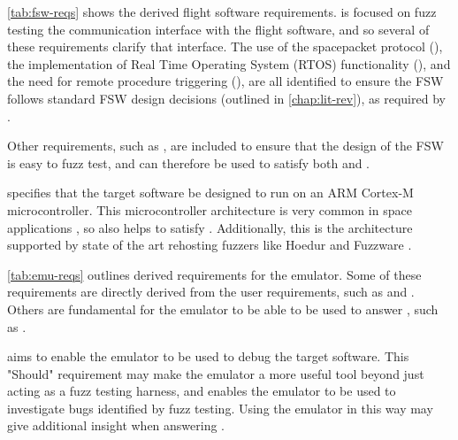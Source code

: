 \documentclass[../report.tex]{subfiles}
\begin{document}
\autoref{tab:fsw-reqs} shows the derived flight software requirements.
 is focused on fuzz testing the communication interface with the
flight software, and so several of these requirements clarify that interface.
The use of the spacepacket protocol (), the implementation of Real
Time Operating System (RTOS) functionality (), and the need for
remote procedure triggering (), are all identified to ensure the
FSW follows standard FSW design decisions (outlined in \autoref{chap:lit-rev}),
as required by .

Other requirements, such as , are included to ensure that the
design of the FSW is easy to fuzz test, and can therefore be used to satisfy
both  and .

 specifies that the target software be designed to run on an ARM
Cortex-M microcontroller. This microcontroller architecture is very common in
space applications \citep{Cratere_2024}, so also helps to satisfy
. Additionally, this is the architecture supported by state of
the art rehosting fuzzers like Hoedur and Fuzzware \citep{Hoedur_2023,
Fuzzware_2022}.

\autoref{tab:emu-reqs} outlines derived requirements for the emulator. Some of
these requirements are directly derived from the user requirements, such as
 and . Others are fundamental for the emulator to
be able to be used to answer , such as .

 aims to enable the emulator to be used to debug the target
software. This "Should" requirement may make the emulator a more useful tool
beyond just acting as a fuzz testing harness, and enables the emulator to be used
to investigate bugs identified by fuzz testing. Using the emulator in this way
may give additional insight when answering .
\end{document}

